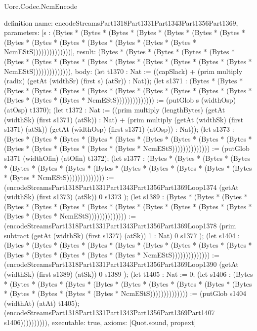 \begin{lexlean}{Uorc.Codec.NcmEncode}
\begin{semanticmodule}
definition{
  name: encodeStreamsPart1318Part1331Part1343Part1356Part1369,
  parameters: [s : (Bytes * (Bytes * (Bytes * (Bytes * (Bytes * (Bytes * (Bytes * (Bytes * (Bytes * (Bytes * (Bytes * (Bytes * (Bytes * (Bytes * NcmEStS))))))))))))))],
  result: (Bytes * (Bytes * (Bytes * (Bytes * (Bytes * (Bytes * (Bytes * (Bytes * (Bytes * (Bytes * (Bytes * (Bytes * (Bytes * (Bytes * NcmEStS)))))))))))))),
  body: (let t1370 : Nat := ((capSlack) + (prim multiply (radix) (getAt (widthSr) (first s) (atSr)) : Nat)); (let s1371 : (Bytes * (Bytes * (Bytes * (Bytes * (Bytes * (Bytes * (Bytes * (Bytes * (Bytes * (Bytes * (Bytes * (Bytes * (Bytes * (Bytes * NcmEStS)))))))))))))) := (putGlob s (widthOsp) (atOsp) t1370); (let t1372 : Nat := ((prim multiply (lengthBytes) (getAt (widthSk) (first s1371) (atSk)) : Nat) + (prim multiply (getAt (widthSk) (first s1371) (atSk)) (getAt (widthOsp) (first s1371) (atOsp)) : Nat)); (let s1373 : (Bytes * (Bytes * (Bytes * (Bytes * (Bytes * (Bytes * (Bytes * (Bytes * (Bytes * (Bytes * (Bytes * (Bytes * (Bytes * (Bytes * NcmEStS)))))))))))))) := (putGlob s1371 (widthOfin) (atOfin) t1372); (let s1377 : (Bytes * (Bytes * (Bytes * (Bytes * (Bytes * (Bytes * (Bytes * (Bytes * (Bytes * (Bytes * (Bytes * (Bytes * (Bytes * (Bytes * NcmEStS)))))))))))))) := (encodeStreamsPart1318Part1331Part1343Part1356Part1369Loop1374 (getAt (widthSk) (first s1373) (atSk)) 0 s1373 ); (let s1389 : (Bytes * (Bytes * (Bytes * (Bytes * (Bytes * (Bytes * (Bytes * (Bytes * (Bytes * (Bytes * (Bytes * (Bytes * (Bytes * (Bytes * NcmEStS)))))))))))))) := (encodeStreamsPart1318Part1331Part1343Part1356Part1369Loop1378 (prim subtract (getAt (widthSk) (first s1377) (atSk)) 1 : Nat) 0 s1377 ); (let s1404 : (Bytes * (Bytes * (Bytes * (Bytes * (Bytes * (Bytes * (Bytes * (Bytes * (Bytes * (Bytes * (Bytes * (Bytes * (Bytes * (Bytes * NcmEStS)))))))))))))) := (encodeStreamsPart1318Part1331Part1343Part1356Part1369Loop1390 (getAt (widthSk) (first s1389) (atSk)) 0 s1389 ); (let t1405 : Nat := 0; (let s1406 : (Bytes * (Bytes * (Bytes * (Bytes * (Bytes * (Bytes * (Bytes * (Bytes * (Bytes * (Bytes * (Bytes * (Bytes * (Bytes * (Bytes * NcmEStS)))))))))))))) := (putGlob s1404 (widthAt) (atAt) t1405); (encodeStreamsPart1318Part1331Part1343Part1356Part1369Part1407 s1406)))))))))),
  executable: true,
  axioms: [Quot.sound, propext]
}


\end{semanticmodule}
\end{lexlean}
